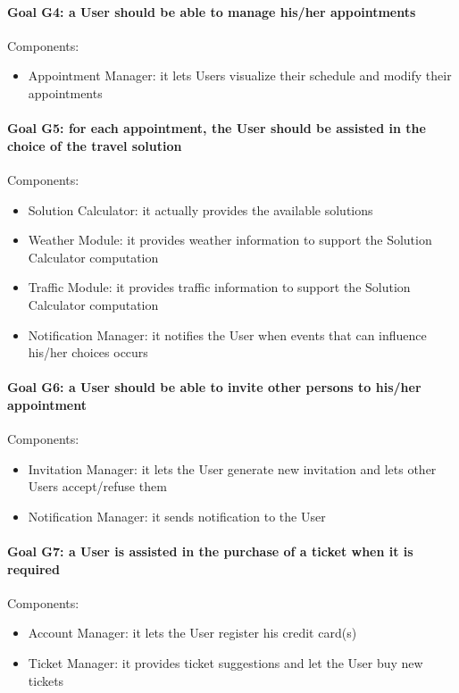 \paragraph{Goal G4: a User should be able to manage his/her appointments}
	Components:
	\begin{itemize}[label=--]
		\item Appointment Manager: it lets Users visualize their schedule and modify their appointments
	\end{itemize}

\paragraph{Goal G5: for each appointment, the User should be assisted in the choice of the travel solution}
	Components:
	\begin{itemize}[label=--]
		\item Solution Calculator: it actually provides the available solutions
		\item Weather Module: it provides weather information to support the Solution Calculator computation
		\item Traffic Module: it provides traffic information to support the Solution Calculator computation
		\item Notification Manager: it notifies the User when events that can influence his/her choices occurs
	\end{itemize}

\paragraph{Goal G6: a User should be able to invite other persons to his/her appointment}
	Components:
	\begin{itemize}[label=--]
		\item Invitation Manager: it lets the User generate new invitation and lets other Users accept/refuse them
		\item Notification Manager: it sends notification to the User
	\end{itemize}

\paragraph{Goal G7: a User is assisted in the purchase of a ticket when it is required}
	Components:
	\begin{itemize}[label=--]
		\item Account Manager: it lets the User register his credit card(s)
		\item Ticket Manager: it provides ticket suggestions and let the User buy new tickets
	\end{itemize}

